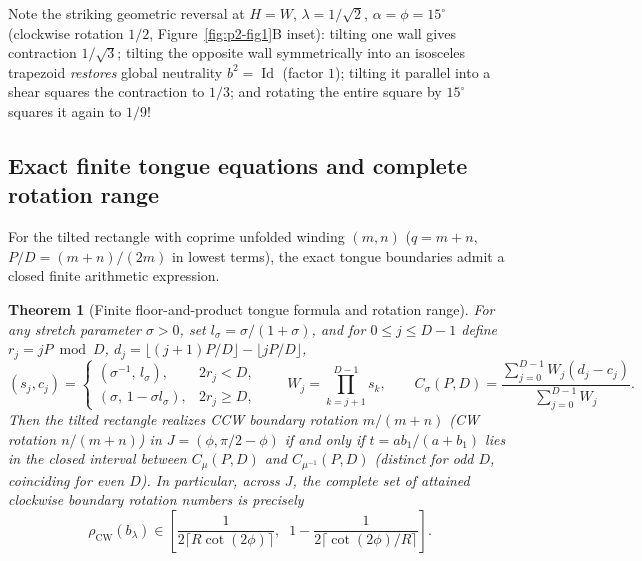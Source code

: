\documentclass[11pt,reqno]{amsart}
\newtheorem{theorem}{Theorem}[section]
\theoremstyle{definition}
\theoremstyle{remark}
\DeclareMathOperator{\Id}{Id}
\begin{document}
Note the striking geometric reversal at $H = W$, $\lambda = 1/\sqrt{2}$, $\alpha = \phi = 15^\circ$ (clockwise rotation $1/2$, Figure~\ref{fig:p2-fig1}B inset): tilting one wall gives contraction $1/\sqrt{3}$; tilting the opposite wall symmetrically into an isosceles trapezoid \emph{restores} global neutrality $b^2 = \Id$ (factor $1$); tilting it parallel into a shear squares the contraction to $1/3$; and rotating the entire square by $15^\circ$ squares it again to $1/9$!

\subsection{Exact finite tongue equations and complete rotation range}
For the tilted rectangle with coprime unfolded winding $(m,n)$ ($q = m+n$, $P/D = (m+n)/(2m)$ in lowest terms), the exact tongue boundaries admit a closed finite arithmetic expression.

\begin{theorem}[Finite floor-and-product tongue formula and rotation range]\label{thm:tongue-formula}
For any stretch parameter $\sigma > 0$, set $l_\sigma = \sigma/(1+\sigma)$, and for $0 \le j \le D-1$ define $r_j = jP \bmod D$, $d_j = \lfloor (j+1)P/D \rfloor - \lfloor jP/D \rfloor$,
\[
  (s_j, c_j) =
  \begin{cases}
    (\sigma^{-1},\, l_\sigma), & 2r_j < D, \\
    (\sigma,\, 1 - \sigma l_\sigma), & 2r_j \ge D,
  \end{cases}
  \qquad W_j = \prod_{k=j+1}^{D-1} s_k, \qquad
  C_\sigma(P,D) = \frac{\sum_{j=0}^{D-1} W_j (d_j - c_j)}{\sum_{j=0}^{D-1} W_j}.
\]
Then the tilted rectangle realizes CCW boundary rotation $m/(m+n)$ (CW rotation $n/(m+n)$) in $J = (\phi, \pi/2-\phi)$ if and only if $t = ab_1/(a+b_1)$ lies in the closed interval between $C_\mu(P,D)$ and $C_{\mu^{-1}}(P,D)$ (distinct for odd $D$, coinciding for even $D$). In particular, across $J$, the complete set of attained clockwise boundary rotation numbers is precisely
\begin{equation}\label{eq:rot-range}
  \rho_{\mathrm{CW}}(b_\lambda) \in \left[ \frac{1}{2\lceil R\cot(2\phi) \rceil},\;\; 1 - \frac{1}{2\lceil \cot(2\phi)/R \rceil} \right].
\end{equation}
\end{theorem}
\end{document}
